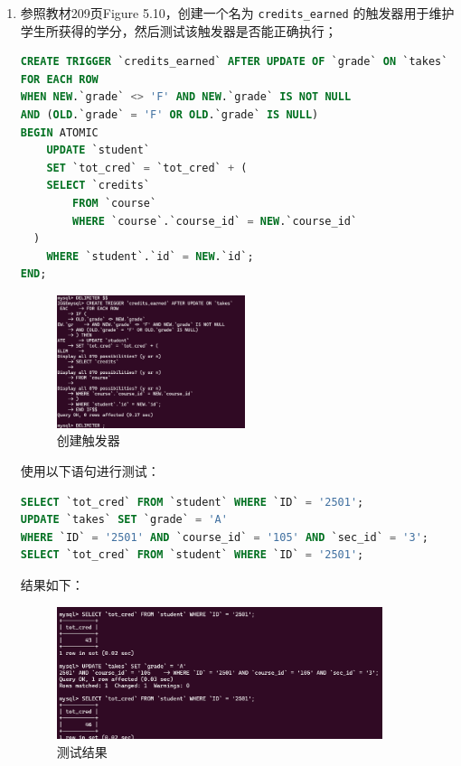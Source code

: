 \documentclass{article}
\renewcommand\tt{\texttt}
\begin{document}
\begin{enumerate}
\item 参照教材209页Figure 5.10，创建一个名为 \tt{credits\_earned} 的触发器用于维护学生所获得的学分，然后测试该触发器是否能正确执行；

\begin{lstlisting}[language=sql]
CREATE TRIGGER `credits_earned` AFTER UPDATE OF `grade` ON `takes`
FOR EACH ROW
WHEN NEW.`grade` <> 'F' AND NEW.`grade` IS NOT NULL
AND (OLD.`grade` = 'F' OR OLD.`grade` IS NULL)
BEGIN ATOMIC
    UPDATE `student`
    SET `tot_cred` = `tot_cred` + (
    SELECT `credits`
        FROM `course`
        WHERE `course`.`course_id` = NEW.`course_id`
  )
    WHERE `student`.`id` = NEW.`id`;
END;
\end{lstlisting}

\begin{figure}[H]
  \centering
  \includegraphics[width=0.52\textwidth]{img/23.png}
  \caption{创建触发器}
\end{figure}

使用以下语句进行测试：

\begin{lstlisting}[language=sql]
SELECT `tot_cred` FROM `student` WHERE `ID` = '2501';
UPDATE `takes` SET `grade` = 'A'
WHERE `ID` = '2501' AND `course_id` = '105' AND `sec_id` = '3';
SELECT `tot_cred` FROM `student` WHERE `ID` = '2501';
\end{lstlisting}

结果如下：

\begin{figure}[H]
  \centering
  \includegraphics[width=0.9\textwidth]{img/24.png}
  \caption{测试结果}
\end{figure}

\end{enumerate}
\end{document}

